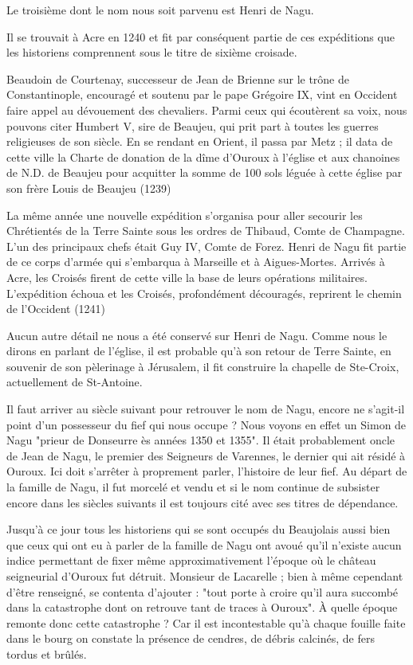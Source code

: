 Le troisième dont le nom nous soit parvenu est Henri de Nagu.

Il se trouvait à Acre en 1240 et fit par conséquent partie de ces expéditions que les historiens comprennent sous le titre de sixième croisade.

Beaudoin de Courtenay, successeur de Jean de Brienne sur le trône de Constantinople, encouragé et soutenu par le pape Grégoire IX, vint en Occident faire appel au dévouement des chevaliers. Parmi ceux qui écoutèrent sa voix, nous pouvons citer Humbert V, sire de Beaujeu, qui prit part à toutes les guerres religieuses de son siècle. En se rendant en Orient, il passa par Metz ; il data de cette ville la Charte de donation de la dîme d'Ouroux à l'église et aux chanoines de N.D. de Beaujeu pour acquitter la somme de 100 sols léguée à cette église par son frère Louis de Beaujeu (1239)

La même année une nouvelle expédition s'organisa pour aller secourir les Chrétientés de la Terre Sainte sous les ordres de Thibaud, Comte de Champagne. L'un des principaux chefs était Guy IV, Comte de Forez. Henri de Nagu fit partie de ce corps d'armée qui s'embarqua à Marseille et à Aigues-Mortes. Arrivés à Acre, les Croisés firent de cette ville la base de leurs opérations militaires. L'expédition échoua et les Croisés, profondément découragés, reprirent le chemin de l'Occident (1241)

Aucun autre détail ne nous a été conservé sur Henri de Nagu. Comme nous le dirons en parlant de l'église, il est probable qu'à son retour de Terre Sainte, en souvenir de son pèlerinage à Jérusalem, il fit construire la chapelle de Ste-Croix, actuellement de St-Antoine.

Il faut arriver au siècle suivant pour retrouver le nom de Nagu, encore ne s'agit-il point d'un possesseur du fief qui nous occupe ? Nous voyons en effet un Simon de Nagu "prieur de Donseurre ès années 1350 et 1355". Il était probablement oncle de Jean de Nagu, le premier des Seigneurs de Varennes, le dernier qui ait résidé à Ouroux. Ici doit s'arrêter à proprement parler, l'histoire de leur fief. Au départ de la famille de Nagu, il fut morcelé et vendu et si le nom continue de subsister encore dans les siècles suivants il est toujours cité avec ses titres de dépendance.

Jusqu'à ce jour tous les historiens qui se sont occupés du Beaujolais aussi bien que ceux qui ont eu à parler de la famille de Nagu ont avoué qu'il n'existe aucun indice permettant de fixer même approximativement l'époque où le château seigneurial d'Ouroux fut détruit. Monsieur de Lacarelle ; bien à même cependant d'être renseigné, se contenta d'ajouter : "tout porte à croire qu'il aura succombé dans la catastrophe dont on retrouve tant de traces à Ouroux". À quelle époque remonte donc cette catastrophe ? Car il est incontestable qu'à chaque fouille faite dans le bourg on constate la présence de cendres, de débris calcinés, de fers tordus et brûlés.


